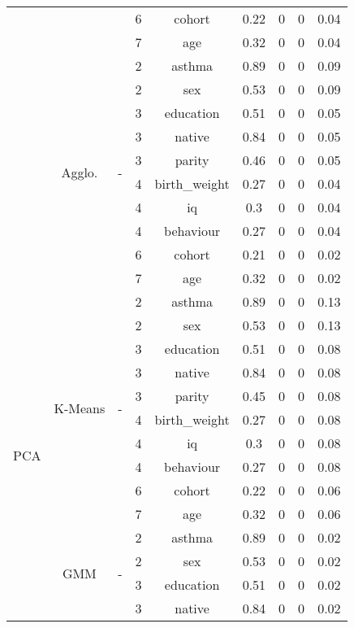 \documentclass[CAT,BIB]{TFUOC}%
\begin{document}
\begin{table}
\begin{tabular}{@{}ccccccccc@{}}
            &  &  & 6 & cohort & 0.22 & 0 & 0 & 0.04 \\
            &  &  & 7 & age & 0.32 & 0 & 0 & 0.04 \\ \cmidrule(l){2-9}
            & \multirow{10}{*}{Agglo.} & \multirow{10}{*}{-} & 2 & asthma & 0.89 & 0 & 0 & 0.09 \\
            &  &  & 2 & sex & 0.53 & 0 & 0 & 0.09 \\
            &  &  & 3 & education & 0.51 & 0 & 0 & 0.05 \\
            &  &  & 3 & native & 0.84 & 0 & 0 & 0.05 \\
            &  &  & 3 & parity & 0.46 & 0 & 0 & 0.05 \\
            &  &  & 4 & birth\_weight & 0.27 & 0 & 0 & 0.04 \\
            &  &  & 4 & iq & 0.3 & 0 & 0 & 0.04 \\
            &  &  & 4 & behaviour & 0.27 & 0 & 0 & 0.04 \\
            &  &  & 6 & cohort & 0.21 & 0 & 0 & 0.02 \\
            &  &  & 7 & age & 0.32 & 0 & 0 & 0.02 \\ \midrule
            \multirow{30}{*}{PCA} & \multirow{10}{*}{K-Means} & \multirow{10}{*}{-} & 2 & asthma & 0.89 & 0 & 0 & 0.13 \\
            &  &  & 2 & sex & 0.53 & 0 & 0 & 0.13 \\
            &  &  & 3 & education & 0.51 & 0 & 0 & 0.08 \\
            &  &  & 3 & native & 0.84 & 0 & 0 & 0.08 \\
            &  &  & 3 & parity & 0.45 & 0 & 0 & 0.08 \\
            &  &  & 4 & birth\_weight & 0.27 & 0 & 0 & 0.08 \\
            &  &  & 4 & iq & 0.3 & 0 & 0 & 0.08 \\
            &  &  & 4 & behaviour & 0.27 & 0 & 0 & 0.08 \\
            &  &  & 6 & cohort & 0.22 & 0 & 0 & 0.06 \\
            &  &  & 7 & age & 0.32 & 0 & 0 & 0.06 \\ \cmidrule(l){2-9}
            & \multirow{10}{*}{GMM} & \multirow{10}{*}{-} & 2 & asthma & 0.89 & 0 & 0 & 0.02 \\
            &  &  & 2 & sex & 0.53 & 0 & 0 & 0.02 \\
            &  &  & 3 & education & 0.51 & 0 & 0 & 0.02 \\
            &  &  & 3 & native & 0.84 & 0 & 0 & 0.02 \\

\end{tabular}
\end{table}
\end{document}
